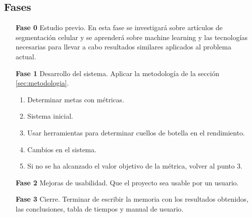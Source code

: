 \subsection{Fases}\label{subsec:fasesplanactualizado}

\begin{itemize}
\item[\textbf{Fase 0}] Estudio previo. En esta fase se investigará sobre artículos de segmentación celular y se aprenderá sobre machine learning y las tecnologías necesarias para llevar a cabo resultados similares aplicados al problema actual.
\item[\textbf{Fase 1}] Desarrollo del sistema. Aplicar la metodología de la sección \ref{sec:metodologia}.
\begin{enumerate}
\item Determinar metas con métricas.
\item Sistema inicial.
\item Usar herramientas para determinar cuellos de botella en el rendimiento.
\item Cambios en el sistema.
\item Si no se ha alcanzado el valor objetivo de la métrica, volver al punto 3.
\end{enumerate}
\item[\textbf{Fase 2}] Mejoras de usabilidad. Que el proyecto sea usable por un usuario.
\item[\textbf{Fase 3}] Cierre. Terminar de escribir la memoria con los resultados obtenidos, las conclusiones, tabla de tiempos y manual de usuario.
\end{itemize}
